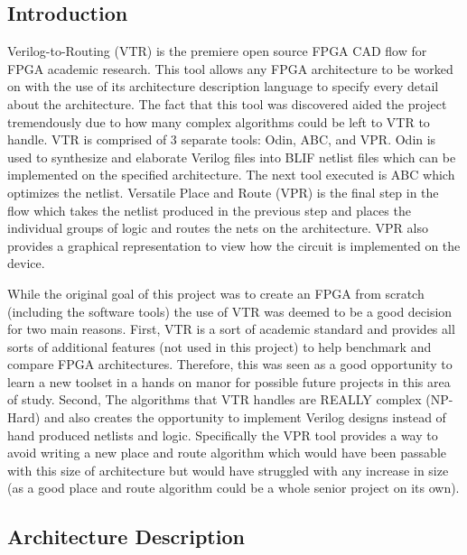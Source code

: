 \documentclass[12pt]{article}
\begin{document}
\subsection{Introduction}

Verilog-to-Routing (VTR) \cite{vtr} is the premiere open source FPGA CAD flow for FPGA academic research.
This tool allows any FPGA architecture to be worked on with the use of its architecture
description language to specify every detail about the architecture.
The fact that this tool was discovered aided the project tremendously due to how many
complex algorithms could be left to VTR to handle. VTR is comprised of 3 separate tools:
Odin, ABC, and VPR. Odin is used to synthesize and elaborate Verilog files into 
BLIF netlist files which can be
implemented on the specified architecture. The next tool executed is ABC which optimizes the
netlist. Versatile Place and Route (VPR) is the final step in the flow which takes the
netlist produced in the previous step and places the individual groups of logic 
and routes the nets on the architecture. VPR also provides a graphical representation to view
how the circuit is implemented on the device.

While the original goal of this project was to create an FPGA from scratch (including
the software tools) the use of VTR was deemed to be a good decision for two main reasons.
First, VTR is a sort of academic standard and provides all sorts of additional
features (not used in this project) to help benchmark and compare FPGA architectures.
Therefore, this was seen as a good opportunity to learn a new toolset in a hands on manor for
possible future projects in this area of study. Second, The algorithms that VTR handles
are REALLY complex (NP-Hard) and also creates the opportunity
to implement Verilog designs instead of hand produced netlists and logic. Specifically the VPR tool
provides a way to avoid writing a new place and route algorithm which would have
been passable with this size of architecture but would have struggled with any increase
in size (as a good place and route algorithm could be a whole senior project on its own).

\subsection{Architecture Description}
\end{document}
